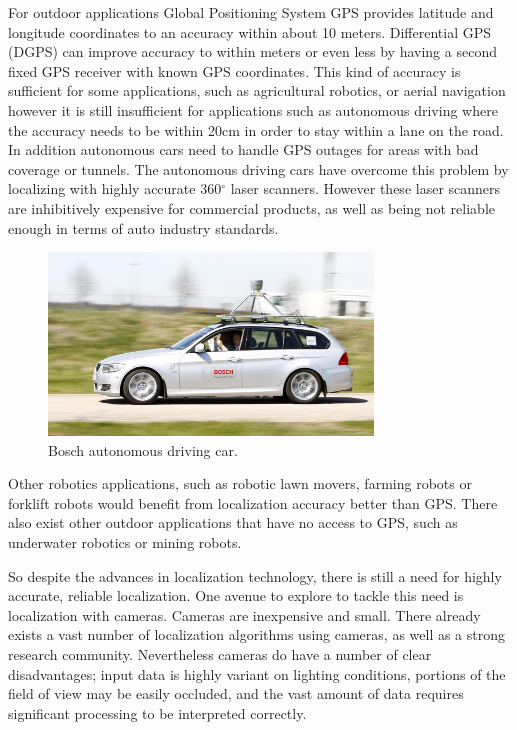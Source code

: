For outdoor applications Global Positioning System GPS provides latitude and longitude coordinates to an accuracy within about 10 meters.  Differential GPS (DGPS) can improve accuracy to within meters or even less by having a second fixed GPS receiver with known GPS coordinates.  This kind of accuracy is sufficient for some applications, such as agricultural robotics, or aerial navigation however it is still insufficient for applications such as autonomous driving where the accuracy needs to be within 20cm in order to stay within a lane on the road.  In addition autonomous cars need to handle GPS outages for areas with bad coverage or tunnels.  The autonomous driving cars have overcome this problem by localizing with highly accurate 360$^{\circ}$ laser scanners.  However these laser scanners are inhibitively expensive for commercial products, as well as being not reliable enough in terms of auto industry standards.

\begin{figure}[h]
  \centering
    \includegraphics[width=0.77\textwidth]{chapters/images/bosch_car}
  \caption{Bosch autonomous driving car.}
  \label{fig:bosch_car}
\end{figure}

Other robotics applications, such as robotic lawn movers, farming robots or forklift robots would benefit from localization accuracy better than GPS.  There also exist other outdoor applications that have no access to GPS, such as underwater robotics or mining robots.

So despite the advances in localization technology, there is still a need for highly accurate, reliable localization.  One avenue to explore to tackle this need is localization with cameras.  Cameras are inexpensive and small.  There already exists a vast number of localization algorithms using cameras, as well as a strong research community.  Nevertheless cameras do have a number of clear disadvantages; input data is highly variant on lighting conditions, portions of the field of view may be easily occluded, and the vast amount of data requires significant processing to be interpreted correctly.

